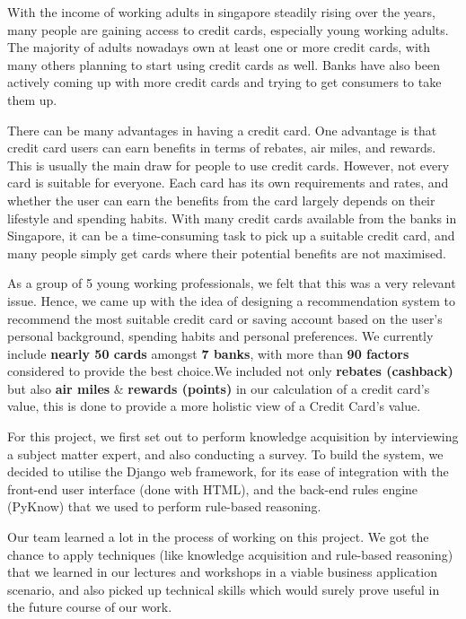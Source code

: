 With the income of working adults in singapore steadily rising over the years, many people are gaining access to credit cards, especially young working adults. The majority of adults nowadays own at least one or more credit cards, with many others planning to start using credit cards as well. Banks have also been actively coming up with more credit cards and trying to get consumers to take them up.

There can be many advantages in having a credit card. One advantage is that credit card users can earn benefits in terms of rebates, air miles, and rewards. This is usually the main draw for people to use credit cards. However, not every card is suitable for everyone. Each card has its own requirements and rates, and whether the user can earn the benefits from the card largely depends on their lifestyle and spending habits. With many credit cards available from the banks in Singapore, it can be a time-consuming task to pick up a suitable credit card, and many people simply get cards where their potential benefits are not maximised.

As a group of 5 young working professionals, we felt that this was a very relevant issue. Hence, we came up with the idea of designing a recommendation system to recommend the most suitable credit card or saving account based on the user’s personal background, spending habits and personal preferences. We currently include \textbf{nearly 50 cards} amongst \textbf{7 banks}, with more than \textbf{90 factors} considered to provide the best choice.We included not only \textbf{rebates (cashback)} but also \textbf{air miles} \& \textbf{rewards (points)} in our calculation of a credit card’s value, this is done to provide a more holistic view of a Credit Card’s value.

For this project, we first set out to perform knowledge acquisition by interviewing a subject matter expert, and also conducting a survey. To build the system, we decided to utilise the Django web framework, for its ease of integration with the front-end user interface (done with HTML), and the back-end rules engine (PyKnow) that we used to perform rule-based reasoning.

Our team learned a lot in the process of working on this project. We got the chance to apply techniques (like knowledge acquisition and rule-based reasoning) that we learned in our lectures and workshops in a viable business application scenario, and also picked up technical skills which would surely prove useful in the future course of our work.
